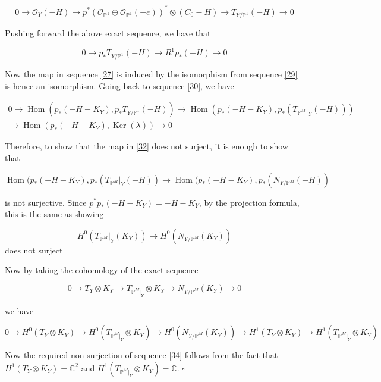 \documentclass[11pt,twoside]{amsart}
\theoremstyle{plain}
\numberwithin{equation}{section}
\theoremstyle{definition}
\newcommand*{\QEDB}{\hfill\ensuremath{\square}}
\begin{document}
\begin{equation}\label{28}
0 \to \mathcal{O}_Y(-H) \to p^*(\mathcal{O}_{\mathbb{P}^1} \oplus \mathcal{O}_{\mathbb{P}^1}(-e))^* \otimes (C_0-H) \to T_{Y/\mathbb{P}^1}(-H) \to 0
\end{equation}

Pushing forward the above exact sequence, we have that 

\begin{equation}\label{29}
 0 \to p_*T_{Y/\mathbb{P}^1}(-H) \to R^1p_*(-H) \to 0 
\end{equation}

Now the map in sequence \ref{27} is induced by the isomorphism from sequence \ref{29} is hence an isomorphism. Going back to sequence \ref{30}, we have 

\begin{multline}\label{31}
0 \to \operatorname{Hom}(p_*(-H-K_Y), 
 p_*T_{Y/\mathbb{P}^1}(-H))  \to \operatorname{Hom}(p_*(-H-K_Y), p_*(T_{\mathbb{P}^M}|_Y(-H))) \\ \to \operatorname{Hom}(p_*(-H-K_Y),\operatorname{Ker}(\lambda)) \to 0
\end{multline}

Therefore, to show that the map in \ref{32} does not surject, it is enough to show that

\begin{equation}\label{33}
  \operatorname{Hom}(p_*(-H-K_Y), p_*(T_{\mathbb{P}^M}|_Y(-H)) \to \operatorname{Hom}(p_*(-H-K_Y), p_*(N_{Y/\mathbb{P}^M}(-H))  
\end{equation}

is not surjective. Since $p^*p_*(-H-K_Y) = -H-K_Y$, by the projection formula, this is the same as showing 

\begin{equation}\label{34}
   H^0(T_{\mathbb{P}^M}|_Y(K_Y)) \to H^0(N_{Y/\mathbb{P}^M}(K_Y)) 
\end{equation}
does not surject

Now by taking the cohomology of the exact sequence 

$$0 \to T_Y \otimes K_Y \to T_{\mathbb{P}^M|_Y} \otimes K_Y \to N_{Y/\mathbb{P}^M}(K_Y) \to 0$$


we have 

$$0 \to H^0(T_Y \otimes K_Y) \to H^0(T_{\mathbb{P}^M|_Y} \otimes K_Y) \to H^0(N_{Y/\mathbb{P}^M}(K_Y)) \to H^1(T_Y \otimes K_Y) \to H^1(T_{\mathbb{P}^M|_Y} \otimes K_Y)$$

Now the required non-surjection of sequence \ref{34} follows from the fact that $H^1(T_Y \otimes K_Y) = \mathbb{C}^2$ and $H^1(T_{\mathbb{P}^M|_Y} \otimes K_Y) = \mathbb{C}$. \QEDB
\end{document}
